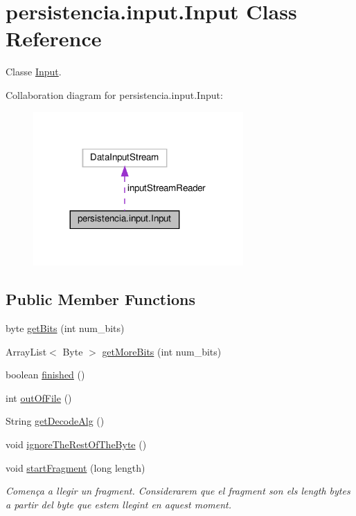\hypertarget{classpersistencia_1_1input_1_1Input}{}\section{persistencia.\+input.\+Input Class Reference}
\label{classpersistencia_1_1input_1_1Input}


Classe \hyperlink{classpersistencia_1_1input_1_1Input}{Input}.  




Collaboration diagram for persistencia.\+input.\+Input\+:\nopagebreak
\begin{figure}[H]
\begin{center}
\leavevmode
\includegraphics[width=227pt]{classpersistencia_1_1input_1_1Input__coll__graph}
\end{center}
\end{figure}
\subsection*{Public Member Functions}
\begin{DoxyCompactItemize}
\item 
byte \hyperlink{classpersistencia_1_1input_1_1Input_a3fa5a378b2155a3022a4a4ef38d63a8e}{get\+Bits} (int num\+\_\+bits)
\item 
Array\+List$<$ Byte $>$ \hyperlink{classpersistencia_1_1input_1_1Input_a81e96a5ac3ca41b5001ffff9f9acc76a}{get\+More\+Bits} (int num\+\_\+bits)
\item 
boolean \hyperlink{classpersistencia_1_1input_1_1Input_af607cad1726ef15cf8e970dcbee74b68}{finished} ()
\item 
int \hyperlink{classpersistencia_1_1input_1_1Input_a3f0fc057e91430b81f5f2c92f91b8ed7}{out\+Of\+File} ()
\item 
String \hyperlink{classpersistencia_1_1input_1_1Input_a95e2068bd17e415f0487f8193f066160}{get\+Decode\+Alg} ()
\item 
void \hyperlink{classpersistencia_1_1input_1_1Input_a2b9b57fce6cb83efe70d5dc205737249}{ignore\+The\+Rest\+Of\+The\+Byte} ()
\item 
void \hyperlink{classpersistencia_1_1input_1_1Input_a619abf26ddafb7a1bde420622d3c7aa5}{start\+Fragment} (long length)
\begin{DoxyCompactList}\small\item\em Comença a llegir un fragment. Considerarem que el fragment son els length bytes a partir del byte que estem llegint en aquest moment. \end{DoxyCompactList}\end{DoxyCompactItemize}
